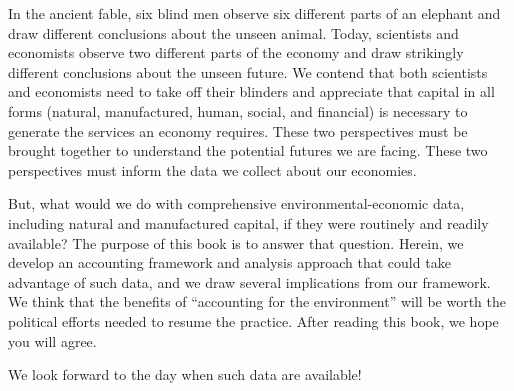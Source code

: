 \vspace{10 mm}

In the ancient fable, 
six blind men observe six different parts 
of an elephant and draw different conclusions 
about the unseen animal.
Today, 
scientists and economists observe two different parts 
of the economy and draw strikingly different conclusions 
about the unseen future. 
We contend that both scientists and economists 
need to take off their blinders and 
appreciate that capital in all forms 
(natural, manufactured, human, social, and financial)
is necessary to generate the services an economy requires. 
These two perspectives must be brought together 
to understand the potential futures we are facing. 
These two perspectives must inform the data we collect about our economies.

But, what would we do with comprehensive environmental-economic data, 
including natural and manufactured capital, 
if they were routinely and readily available? 
The purpose of this book is to answer that question.
Herein, we develop an accounting framework 
and analysis approach that could take advantage of such data,
and we draw several implications from our framework.
We think that the benefits of ``accounting for the environment''
will be worth the political efforts needed
to resume the practice.
After reading this book, we hope you will agree.

We look forward to the day when such data are available!







%
%

